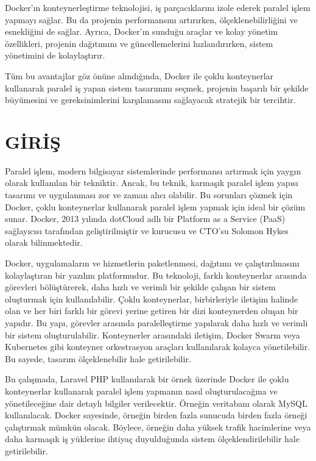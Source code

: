 Docker'ın konteynerleştirme teknolojisi, iş parçacıklarını izole ederek paralel işlem yapmayı sağlar. Bu da projenin performansını artırırken, ölçeklenebilirliğini ve esnekliğini de sağlar. Ayrıca, Docker'ın sunduğu araçlar ve kolay yönetim özellikleri, projenin dağıtımını ve güncellemelerini hızlandırırken, sistem yönetimini de kolaylaştırır.

Tüm bu avantajlar göz önüne alındığında, Docker ile çoklu konteynerlar kullanarak paralel iş yapan sistem tasarımını seçmek, projenin başarılı bir şekilde büyümesini ve gereksinimlerini karşılamasını sağlayacak stratejik bir tercihtir.
\section{GİRİŞ}
Paralel işlem, modern bilgisayar sistemlerinde performansı artırmak için yaygın olarak kullanılan bir tekniktir. Ancak, bu teknik, karmaşık paralel işlem yapısı tasarımı ve uygulanması zor ve zaman alıcı olabilir. Bu sorunları çözmek için Docker, çoklu konteynerlar kullanarak paralel işlem yapmak için ideal bir çözüm sunar. Docker, 2013 yılında dotCloud adlı bir Platform as a Service (PaaS) sağlayıcısı tarafından geliştirilmiştir ve kurucusu ve CTO’su Solomon Hykes olarak bilinmektedir.

Docker, uygulamaların ve hizmetlerin paketlenmesi, dağıtımı ve çalıştırılmasını kolaylaştıran bir yazılım platformudur. Bu teknoloji, farklı konteynerlar arasında görevleri bölüştürerek, daha hızlı ve verimli bir şekilde çalışan bir sistem oluşturmak için kullanılabilir. Çoklu konteynerlar, birbirleriyle iletişim halinde olan ve her biri farklı bir görevi yerine getiren bir dizi konteynerden oluşan bir yapıdır. Bu yapı, görevler arasında paralelleştirme yapılarak daha hızlı ve verimli bir sistem oluşturulabilir. Konteynerler arasındaki iletişim, Docker Swarm veya Kubernetes gibi konteyner orkestrasyon araçları kullanılarak kolayca yönetilebilir. Bu sayede, tasarım ölçeklenebilir hale getirilebilir.

Bu çalışmada, Laravel PHP kullanılarak bir örnek üzerinde Docker ile çoklu konteynerlar kullanarak paralel işlem yapmanın nasıl oluşturulacağına ve yönetileceğine dair detaylı bilgiler verilecektir. Örneğin veritabanı olarak MySQL kullanılacak. Docker sayesinde, örneğin birden fazla sunucuda birden fazla örneği çalıştırmak mümkün olacak. Böylece, örneğin daha yüksek trafik hacimlerine veya daha karmaşık iş yüklerine ihtiyaç duyulduğunda sistem ölçeklendirilebilir hale getirilebilir.

